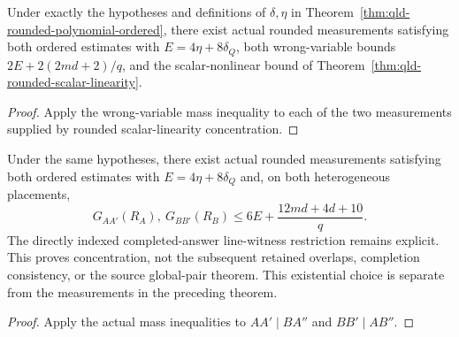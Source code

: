 \begin{theorem}
\label{thm:qld-rounded-wrong-variable-mass}
\leanok
Under exactly the hypotheses and definitions of $\delta,\eta$ in
Theorem~\ref{thm:qld-rounded-polynomial-ordered}, there exist actual rounded
measurements satisfying both ordered estimates with $E=4\eta+8\delta_Q$,
both wrong-variable bounds $2E+2(2md+2)/q$, and the scalar-nonlinear bound
of Theorem~\ref{thm:qld-rounded-scalar-linearity}.
\end{theorem}
\begin{proof}
\leanok
{}
Apply the wrong-variable mass inequality to each of the two measurements
supplied by rounded scalar-linearity concentration.
\end{proof}

\begin{theorem}
\label{thm:qld-rounded-separated-mass}
\leanok
Under the same hypotheses, there exist actual rounded measurements satisfying
both ordered estimates with $E=4\eta+8\delta_Q$ and, on both heterogeneous
placements,
\[
 G_{AA'}(R_A),\ G_{BB'}(R_B)\leq6E+\frac{12md+4d+10}q.
\]
The directly indexed completed-answer line-witness restriction remains
explicit. This proves concentration, not the subsequent retained overlaps,
completion consistency, or the source global-pair theorem.
This existential choice is separate from the measurements in the preceding theorem.
\end{theorem}
\begin{proof}
\leanok
{}
Apply the actual mass inequalities to $AA'\mid BA''$ and $BB'\mid AB''$.
\end{proof}

